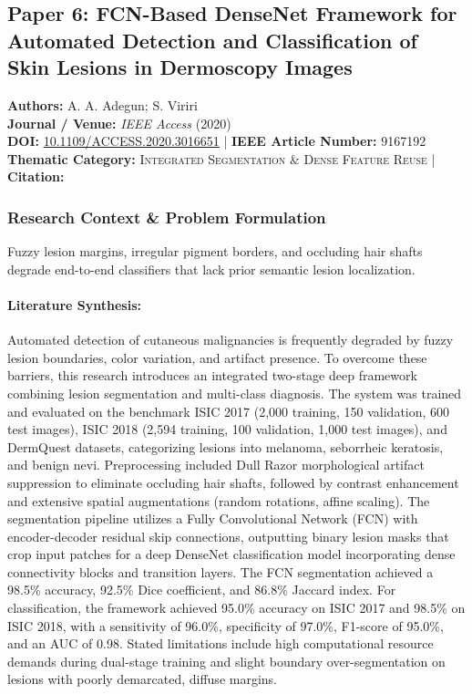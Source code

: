 \subsection{Paper 6: FCN-Based DenseNet Framework for Automated Detection and Classification of Skin Lesions in Dermoscopy Images}
\label{sec:paper_6}

\begin{tcolorbox}[colback=gray!5!white,colframe=gray!75!black,title=\textbf{Metadata \& Citation Summary}]
\textbf{Authors:} A. A. Adegun; S. Viriri \\
\textbf{Journal / Venue:} \textit{IEEE Access} (2020) \\
\textbf{DOI:} \href{https://doi.org/10.1109/ACCESS.2020.3016651}{10.1109/ACCESS.2020.3016651} \quad | \quad \textbf{IEEE Article Number:} 9167192 \\
\textbf{Thematic Category:} \textsc{Integrated Segmentation \& Dense Feature Reuse} \quad | \quad \textbf{Citation:} \cite{9167192}
\end{tcolorbox}

\subsubsection*{Research Context \& Problem Formulation}
Fuzzy lesion margins, irregular pigment borders, and occluding hair shafts degrade end-to-end classifiers that lack prior semantic lesion localization.

\paragraph{Literature Synthesis:} Automated detection of cutaneous malignancies is frequently degraded by fuzzy lesion boundaries, color variation, and artifact presence. To overcome these barriers, this research introduces an integrated two-stage deep framework combining lesion segmentation and multi-class diagnosis. The system was trained and evaluated on the benchmark ISIC 2017 (2,000 training, 150 validation, 600 test images), ISIC 2018 (2,594 training, 100 validation, 1,000 test images), and DermQuest datasets, categorizing lesions into melanoma, seborrheic keratosis, and benign nevi. Preprocessing included Dull Razor morphological artifact suppression to eliminate occluding hair shafts, followed by contrast enhancement and extensive spatial augmentations (random rotations, affine scaling). The segmentation pipeline utilizes a Fully Convolutional Network (FCN) with encoder-decoder residual skip connections, outputting binary lesion masks that crop input patches for a deep DenseNet classification model incorporating dense connectivity blocks and transition layers. The FCN segmentation achieved a 98.5\% accuracy, 92.5\% Dice coefficient, and 86.8\% Jaccard index. For classification, the framework achieved 95.0\% accuracy on ISIC 2017 and 98.5\% on ISIC 2018, with a sensitivity of 96.0\%, specificity of 97.0\%, F1-score of 95.0\%, and an AUC of 0.98. Stated limitations include high computational resource demands during dual-stage training and slight boundary over-segmentation on lesions with poorly demarcated, diffuse margins.


